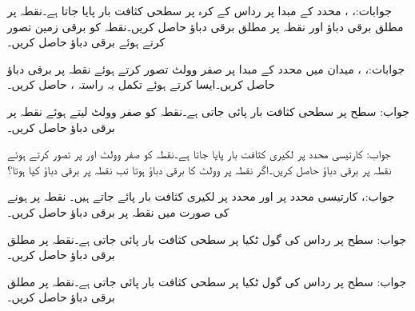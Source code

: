 جوابات:، ، 
محدد کے مبدا پر  رداس کے کرہ پر سطحی کثافت بار  پایا جاتا ہے۔نقطہ  پر مطلق برقی دباؤ  اور  نقطہ   پر مطلق برقی دباؤ  حاصل کریں۔نقطہ  کو برقی زمین تصور کرتے ہوئے برقی دباؤ  حاصل کریں۔ 

جوابات:، ، 
میدان  میں محدد کے مبدا پر صفر وولٹ تصور کرتے ہوئے نقطہ  پر برقی دباؤ حاصل کریں۔ایسا کرتے ہوئے تکمل بہ راستہ ،  حاصل کریں۔

جواب:
سطح  پر سطحی کثافت بار  پائی جاتی ہے۔نقطہ  کو صفر وولٹ لیتے ہوئے  نقطہ  پر برقی دباؤ  حاصل کریں۔

جواب:
کارتیسی  محدد پر لکیری کثافت بار  پایا جاتا ہے۔نقطہ  کو صفر وولٹ اور پر تصور کرتے ہوئے نقطہ  پر برقی دباؤ حاصل کریں۔اگر نقطہ  پر  وولٹ کا برقی دباؤ ہوتا تب نقطہ  پر برقی دباؤ کیا ہوتا؟

جواب:، 
کارتیسی  محدد پر  اور  محدد پر  لکیری کثافت بار پائے جاتے ہیں۔ نقطہ  پر  ہونے کی صورت میں نقطہ  پر برقی دباؤ حاصل کریں۔

جواب:
 سطح  پر رداس  کی گول ٹکیا  پر سطحی کثافت بار  پائی جاتی ہے۔نقطہ  پر  مطلق برقی دباؤ حاصل کریں۔

جواب:
 سطح  پر رداس  کی گول ٹکیا  پر سطحی کثافت بار  پائی جاتی ہے۔نقطہ  پر  مطلق برقی دباؤ حاصل کریں۔

